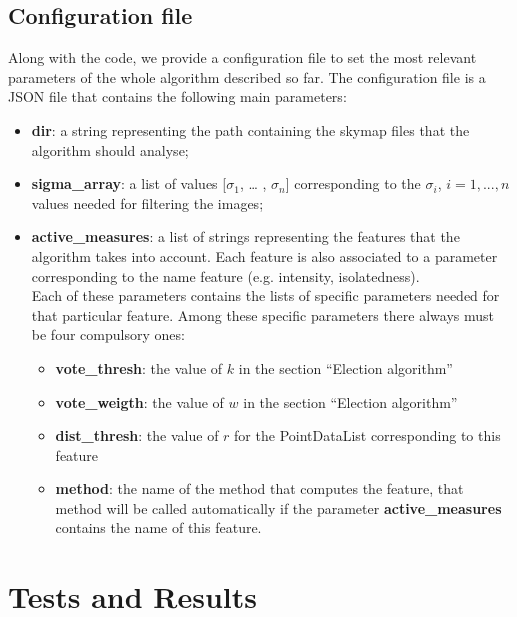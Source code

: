 \documentclass[a4paper,12pt,oneside]{book}
\begin{document}
\begin{onehalfspace}
	\section{Configuration file}
	Along with the code, we provide a configuration file to set the most relevant parameters of the whole algorithm described so far.
	The configuration file is a JSON file that contains the following main parameters:
	\begin{itemize}
    	\setlength\itemsep{0em}
    	\item \textbf{dir}: a string representing the path containing the skymap files that the algorithm should analyse;
    	\item \textbf{sigma\_array}: a list of values [$\sigma_1$, … , $\sigma_n$] corresponding to the $\sigma_i$, $i = 1,...,n$ values needed for filtering the images;
    	\item \textbf{active\_measures}: a list of strings representing the features that the algorithm takes into account. Each feature is also associated to a parameter corresponding to the name feature (e.g. intensity, isolatedness). \\ Each of these parameters contains the lists of specific parameters needed for that particular
    	feature. Among these specific parameters there always must be four compulsory ones:
    	\begin{itemize}
        	\setlength\itemsep{0em}
        	\item \textbf{vote\_thresh}: the value of $k$ in the section “Election algorithm”
        	\item \textbf{vote\_weigth}: the value of $w$ in the section “Election algorithm”
        	\item \textbf{dist\_thresh}: the value of $r$ for the PointDataList corresponding to this feature
        	\item \textbf{method}: the name of the method that computes the feature, that method will be called automatically if the parameter \textbf{active\_measures} contains the name of this feature.
    	\end{itemize}
    \end{itemize}
	
	\chapter{Tests and Results}
	

\end{onehalfspace}
\end{document}
